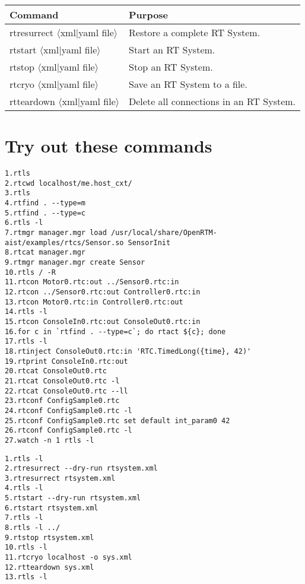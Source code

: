 \documentclass[a4paper,10pt]{article}
\begin{document}
\begin{table}
  \centering
  \begin{tabularx}{\columnwidth}{ll}
    \toprule
    Command & Purpose \\
    \midrule
    rtresurrect $\langle$xml|yaml file$\rangle$ & Restore a complete RT System. \\
    rtstart $\langle$xml|yaml file$\rangle$ & Start an RT System. \\
    rtstop $\langle$xml|yaml file$\rangle$ & Stop an RT System. \\
    rtcryo $\langle$xml|yaml file$\rangle$ & Save an RT System to a file. \\
    rtteardown $\langle$xml|yaml file$\rangle$ & Delete all connections in an RT System. \\
    \bottomrule
  \end{tabularx}
\end{table}

\newpage

\section*{Try out these commands}

\begin{lstlisting}[frame=tb]
1.rtls
2.rtcwd localhost/me.host_cxt/
3.rtls
4.rtfind . --type=m
5.rtfind . --type=c
6.rtls -l
7.rtmgr manager.mgr load /usr/local/share/OpenRTM-aist/examples/rtcs/Sensor.so SensorInit
8.rtcat manager.mgr
9.rtmgr manager.mgr create Sensor
10.rtls / -R
11.rtcon Motor0.rtc:out ../Sensor0.rtc:in
12.rtcon ../Sensor0.rtc:out Controller0.rtc:in
13.rtcon Motor0.rtc:in Controller0.rtc:out
14.rtls -l
15.rtcon ConsoleIn0.rtc:out ConsoleOut0.rtc:in
16.for c in `rtfind . --type=c`; do rtact ${c}; done
17.rtls -l
18.rtinject ConsoleOut0.rtc:in 'RTC.TimedLong({time}, 42)'
19.rtprint ConsoleIn0.rtc:out
20.rtcat ConsoleOut0.rtc
21.rtcat ConsoleOut0.rtc -l
22.rtcat ConsoleOut0.rtc --ll
23.rtconf ConfigSample0.rtc
24.rtconf ConfigSample0.rtc -l
25.rtconf ConfigSample0.rtc set default int_param0 42
26.rtconf ConfigSample0.rtc -l
27.watch -n 1 rtls -l
\end{lstlisting}

\vspace{1cm}

\begin{lstlisting}[frame=tb]
1.rtls -l
2.rtresurrect --dry-run rtsystem.xml
3.rtresurrect rtsystem.xml
4.rtls -l
5.rtstart --dry-run rtsystem.xml
6.rtstart rtsystem.xml
7.rtls -l
8.rtls -l ../
9.rtstop rtsystem.xml
10.rtls -l
11.rtcryo localhost -o sys.xml
12.rtteardown sys.xml
13.rtls -l
\end{lstlisting}

\end{document}
